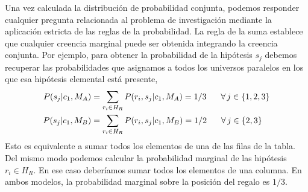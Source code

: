 \documentclass[a4paper,11pt]{book}
\theoremstyle{definition}
\begin{document}
Una vez calculada la distribuci\'on de probabilidad conjunta, podemos responder cualquier pregunta relacionada al problema de investigaci\'on mediante la aplicaci\'on estricta de las reglas de la probabilidad.
%
La regla de la suma establece que cualquier creencia marginal puede ser obtenida integrando la creencia conjunta.
%
Por ejemplo, para obtener la probabilidad de la hip\'otesis $s_j$ debemos recuperar las probabilidades que asignamos a todos los universos paralelos en los que esa hip\'otesis elemental est\'a presente,
%
\begin{equation} \label{eq:creencia_marginal}
\begin{split}
P(s_j|c_1,M_A) &= \sum_{r_i \in H_R} P(r_i, s_j|c_1, M_A) = 1/3 \hspace{0.6cm} \forall\,j \in \{1,2,3\} \\
P(s_j|c_1,M_B) &= \sum_{r_i \in H_R} P(r_i, s_j|c_1, M_B) = 1/2 \hspace{0.6cm} \forall\,j \in \{2,3\}
\end{split}
\end{equation}
%
Esto es equivalente a sumar todos los elementos de una de las filas de la tabla.
%
Del mismo modo podemos calcular la probabilidad marginal de las hip\'otesis $r_i \in H_R$.
%
En ese caso deber\'iamos sumar todos los elementos de una columna.
%
En ambos modelos, la probabilidad marginal sobre la posici\'on del regalo es $1/3$.

\end{document}
